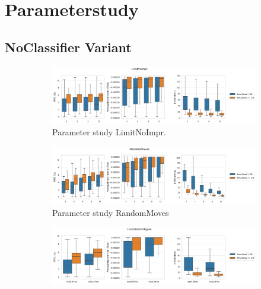 \clearpage


\section{Parameterstudy}

\subsection{NoClassifier Variant}
\label{app:subsec:parameterstudy_noclassifier}


\begin{figure}[!ht]
	\centering
	\begin{subfigure}[t]{0.83\textwidth}
		\centering
		\includegraphics[width=\textwidth]{pictures/parameter_study/LimitNoImpr_base_parameter_study.png}
		\caption{Parameter study LimitNoImpr.}
	\end{subfigure}
	\begin{subfigure}[t]{0.83\textwidth}
		\centering
		\includegraphics[width=\textwidth]{pictures/parameter_study/RandomMoves_base_parameter_study.png}
		\caption{Parameter study RandomMoves}
	\end{subfigure}
	\begin{subfigure}[t]{0.83\textwidth}
		\centering
		\includegraphics[width=\textwidth]{pictures/parameter_study/LocalSearchTypes_base_parameter_study.png}

\end{subfigure}
\end{figure}
